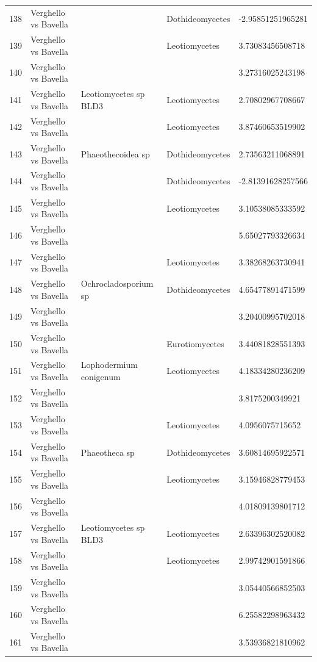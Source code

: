 \documentclass[12pt]{article}\usepackage[]{graphicx}\usepackage[]{color}
\numberwithin{figure}{section}
\begin{document}
\begin{table}[ht]
\begin{tabular}{lllll}
  138 & Verghello vs Bavella &  & Dothideomycetes & -2.95851251965281 \\ 
  139 & Verghello vs Bavella &  & Leotiomycetes & 3.73083456508718 \\ 
  140 & Verghello vs Bavella &  &  & 3.27316025243198 \\ 
  141 & Verghello vs Bavella & Leotiomycetes sp BLD3 & Leotiomycetes & 2.70802967708667 \\ 
  142 & Verghello vs Bavella &  & Leotiomycetes & 3.87460653519902 \\ 
  143 & Verghello vs Bavella & Phaeothecoidea sp & Dothideomycetes & 2.73563211068891 \\ 
  144 & Verghello vs Bavella &  & Dothideomycetes & -2.81391628257566 \\ 
  145 & Verghello vs Bavella &  & Leotiomycetes & 3.10538085333592 \\ 
  146 & Verghello vs Bavella &  &  & 5.65027793326634 \\ 
  147 & Verghello vs Bavella &  & Leotiomycetes & 3.38268263730941 \\ 
  148 & Verghello vs Bavella & Ochrocladosporium sp & Dothideomycetes & 4.65477891471599 \\ 
  149 & Verghello vs Bavella &  &  & 3.20400995702018 \\ 
  150 & Verghello vs Bavella &  & Eurotiomycetes & 3.44081828551393 \\ 
  151 & Verghello vs Bavella & Lophodermium conigenum & Leotiomycetes & 4.18334280236209 \\ 
  152 & Verghello vs Bavella &  &  & 3.8175200349921 \\ 
  153 & Verghello vs Bavella &  & Leotiomycetes & 4.0956075715652 \\ 
  154 & Verghello vs Bavella & Phaeotheca sp & Dothideomycetes & 3.60814695922571 \\ 
  155 & Verghello vs Bavella &  & Leotiomycetes & 3.15946828779453 \\ 
  156 & Verghello vs Bavella &  &  & 4.01809139801712 \\ 
  157 & Verghello vs Bavella & Leotiomycetes sp BLD3 & Leotiomycetes & 2.63396302520082 \\ 
  158 & Verghello vs Bavella &  & Leotiomycetes & 2.99742901591866 \\ 
  159 & Verghello vs Bavella &  &  & 3.05440566852503 \\ 
  160 & Verghello vs Bavella &  &  & 6.25582298963432 \\ 
  161 & Verghello vs Bavella &  &  & 3.53936821810962 \\ 

\end{tabular}
\end{table}
\end{document}
